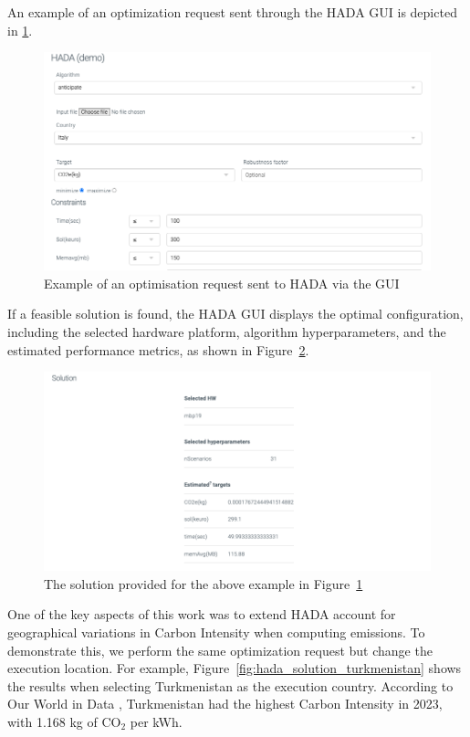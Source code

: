 \documentclass[a4paper,singleside,12pt]{report} %
\begin{document}
An example of an optimization request sent through the HADA GUI is depicted in \ref{fig:hada_optimisation_req}.

\begin{figure}[h!]
    \centering
    \includegraphics[width=\textwidth]{imgs/HADA-optimisation-req.png}
    \caption{Example of an optimisation request sent to HADA via the GUI}
    \label{fig:hada_optimisation_req}
\end{figure}

If a feasible solution is found, the HADA GUI displays the optimal configuration, including the selected hardware platform, algorithm hyperparameters, and the estimated performance metrics, as shown in Figure~\ref{fig:hada_solution}.

\begin{figure}[h!]
    \centering
    \includegraphics[width=\textwidth]{imgs/hada-solution-italy.png}
    \caption{The solution provided for the above example in Figure~\ref{fig:hada_optimisation_req}}
    \label{fig:hada_solution}
\end{figure}

One of the key aspects of this work was to extend HADA account for geographical variations in Carbon Intensity when computing emissions. To demonstrate this, we perform the same 
optimization request but change the execution location. For example, Figure~\ref{fig:hada_solution_turkmenistan} shows the results when selecting Turkmenistan as the execution country. 
According to Our World in Data \cite{ember2024carbonintensity}, Turkmenistan had the highest Carbon Intensity in 2023, with 1.168 kg of CO$_2$ per kWh.
\end{document}
